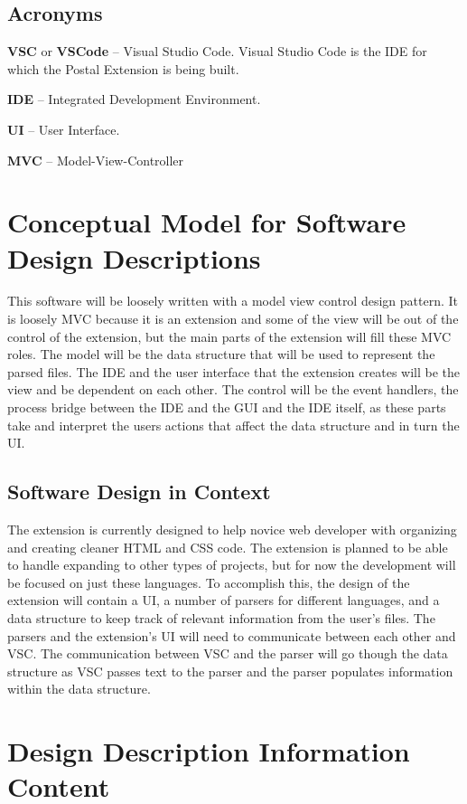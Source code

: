 \documentclass[letterpaper,10pt,titlepage,draftclsnofoot,onecolumn,onesided] {IEEEtran}
\begin{document}
\subsection{Acronyms}
\textbf{VSC} or \textbf{VSCode} -- Visual Studio Code. Visual Studio Code is the IDE for which the Postal Extension is being built. 

\textbf{IDE} -- Integrated Development Environment. 

\textbf{UI} -- User Interface. 

\textbf{MVC} -- Model-View-Controller


\section{Conceptual Model for Software Design Descriptions}
This software will be loosely written with a model view control design pattern.
It is loosely MVC because it is an extension and some of the view will be out of the control of the extension, but the main parts of the extension will fill these MVC roles.
The model will be the data structure that will be used to represent the parsed files. 
The IDE and the user interface that the extension creates will be the view and be dependent on each other.
The control will be the event handlers, the process bridge between the IDE and the GUI and the IDE itself, as these parts take and interpret the users actions that affect the data structure and in turn the UI.

\subsection{Software Design in Context}
The extension is currently designed to help novice web developer with organizing and creating cleaner HTML and CSS code.
The extension is planned to be able to handle expanding to other types of projects, but for now the development will be focused on just these languages. 
To accomplish this, the design of the extension will contain a UI, a number of parsers for different languages, and a data structure to keep track of relevant information from the user's files.
The parsers and the extension's UI will need to communicate between each other and VSC.
The communication between VSC and the parser will go though the data structure as VSC passes text to the parser and the parser populates information within the data structure.

\section{Design Description Information Content}
\end{document}
